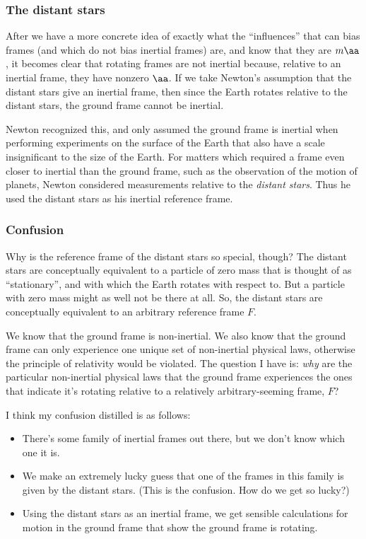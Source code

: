 \documentclass{article}
\begin{document}
\subsubsection*{The distant stars}

After we have a more concrete idea of exactly what the ``influences'' that can bias frames (and which do not bias inertial frames) are, and know that they are $m\aa$, it becomes clear that rotating frames are not inertial because, relative to an inertial frame, they have nonzero $\aa$. If we take Newton's assumption that the distant stars give an inertial frame, then since the Earth rotates relative to the distant stars, the ground frame cannot be inertial.

Newton recognized this, and only assumed the ground frame is inertial when performing experiments on the surface of the Earth that also have a scale insignificant to the size of the Earth. For matters which required a frame even closer to inertial than the ground frame, such as the observation of the motion of planets, Newton considered measurements relative to the \textit{distant stars}. Thus he used the distant stars as his inertial reference frame.

\subsubsection*{Confusion}

Why is the reference frame of the distant stars so special, though? The distant stars are conceptually equivalent to a particle of zero mass that is thought of as ``stationary'', and with which the Earth rotates with respect to. But a particle with zero mass might as well not be there at all. So, the distant stars are conceptually equivalent to an arbitrary reference frame $F$.

We know that the ground frame is non-inertial. We also know that the ground frame can only experience one unique set of non-inertial physical laws, otherwise the principle of relativity would be violated. The question I have is: \textit{why} are the particular non-inertial physical laws that the ground frame experiences the ones that indicate it's rotating relative to a relatively arbitrary-seeming frame, $F$?

I think my confusion distilled is as follows:

\begin{itemize}
    \item There's some family of inertial frames out there, but we don't know which one it is.
    \item We make an extremely lucky guess that one of the frames in this family is given by the distant stars. (This is the confusion. How do we get so lucky?)
    \item Using the distant stars as an inertial frame, we get sensible calculations for motion in the ground frame that show the ground frame is rotating.
\end{itemize}
\end{document}
